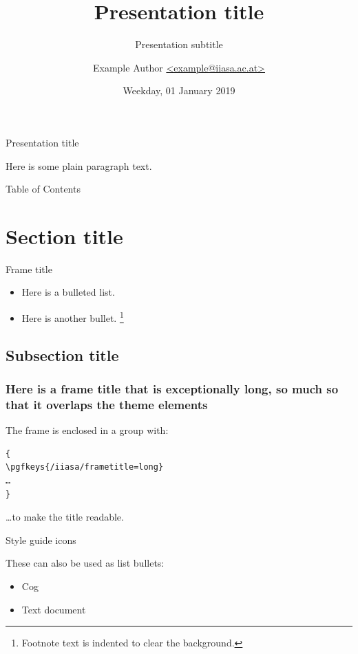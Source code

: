 \documentclass[aspectratio=169]{beamer}
\title{Presentation title}
\subtitle{Presentation subtitle}
\author{Example Author
  \href{mailto:example@iiasa.ac.at}%
  {\ttfamily <example@iiasa.ac.at>}}
\date{Weekday, 01 January 2019}
\institute{Venue for presentation}
\begin{document}
\maketitle

\begin{frame}{Presentation title}

  Here is some plain paragraph text.

\end{frame}

\begin{frame}{Table of Contents}

  \tableofcontents

\end{frame}

\section{Section title}

\begin{frame}{Frame title}

  \begin{itemize}
    \item Here is a bulleted list.
    \item Here is another bullet.
          \footnote{Footnote text is indented to clear the background.}
  \end{itemize}

\end{frame}

\subsection{Subsection title}

{
  \begin{frame}[fragile]

    \frametitle{Here is a frame title that is exceptionally long, so much so that it overlaps the theme elements}

    The frame is enclosed in a group with:
    \begin{verbatim}
{
\pgfkeys{/iiasa/frametitle=long}
…
}
\end{verbatim}
    …to make the title readable.

  \end{frame}
}

\begin{frame}{Style guide icons}


  These can also be used as list bullets:

  \begin{itemize}
    \item [\iiasaicon{cog}] Cog
    \item [\iiasaicon{doc-text}] Text document
  \end{itemize}

\end{frame}
\end{document}
